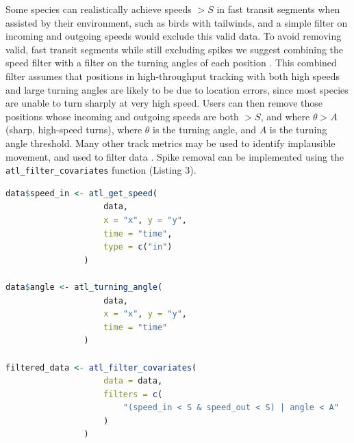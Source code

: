 \documentclass[10pt,paper=a4,headings=standardclasses
]{scrartcl}
\begin{document}
Some species can realistically achieve speeds $> S$ in fast transit segments when assisted by their environment, such as birds with tailwinds, and a simple filter on incoming and outgoing speeds would exclude this valid data.
To avoid removing valid, fast transit segments while still excluding spikes we suggest combining the speed filter with a filter on the turning angles of each position \citep[see][]{calenge2009}.
This combined filter assumes that positions in high-throughput tracking with both high speeds and large turning angles are likely to be due to location errors, since most species are unable to turn sharply at very high speed.
Users can then remove those positions whose incoming and outgoing speeds are both $> S$, and where $\theta > A$ (sharp, high-speed turns), where $\theta$ is the turning angle, and $A$ is the turning angle threshold.
Many other track metrics may be used to identify implausible movement, and used to filter data \citep{seidel2018}.
Spike removal can be implemented using the \texttt{atl\_filter\_covariates} function (Listing 3).

\begin{lstlisting}[float, language=R, style=customR, caption = {
    Filtering a movement track on incoming and outgoing speeds, and on turning angle to remove unrealistic movement.
    The functions \texttt{atl\_get\_speed} and \texttt{atl\_turning\_angle} are used to get the speeds and turning angles before filtering, and assigned to a column in the data (assignment of \texttt{speed\_out} is not shown).
    The filter step only retains positions with speeds below the speed threshold $S$ \textit{or} angles above the turning angle threshold $\theta$, i.e., positions where the animal is slow but makes sharp turns, and data where the animal moves quickly in a relatively straight line.}]
data$speed_in <- atl_get_speed(
                    data,
                    x = "x", y = "y",
                    time = "time", 
                    type = c("in")
                )

data$angle <- atl_turning_angle(
                    data,
                    x = "x", y = "y", 
                    time = "time"
                )

filtered_data <- atl_filter_covariates(
                    data = data,
                    filters = c(
                        "(speed_in < S & speed_out < S) | angle < A"
                    )
                )
\end{lstlisting}
\end{document}
